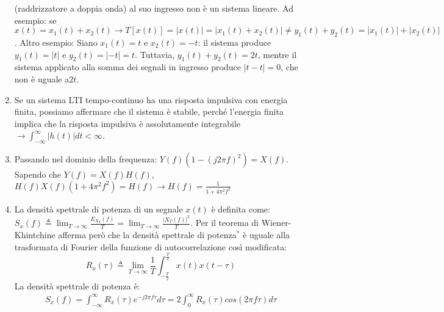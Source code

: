 \documentclass[
  paper=a4,
  ,captions=tableheading
]{scrartcl}
\begin{document}
\begin{enumerate}
  (raddrizzatore a doppia onda) al suo ingresso non è un sistema
  lineare. Ad esempio: se
  \(\displaystyle x(t)=  x_1(t)+x_2(t) \to T[x(t)]  = |x(t)| = |x_1(t)+x_2(t)| \neq y_1(t)+y_2(t) = |x_1(t)|+|x_2(t)|\).
  Altro esempio: Siano \(x_1(t) = t\) e \(x_2(t) = -t\): il sistema
  produce \(y_1(t) = |t|\) e \(y_2(t) = |-t| = t\). Tuttavia,
  \(y_1(t) + y_2(t) = 2t\), mentre il sistema applicato alla somma dei
  segnali in ingresso produce \(|t - t| = 0\), che non è uguale a\(2t\).
\item
  Se un sistema LTI tempo-continuo ha una risposta impulsiva con energia
  finita, possiamo affermare che il sistema è stabile, perché l'energia
  finita implica che la risposta impulsiva è assolutamente integrabile
  \(\to  \displaystyle \int_{-\infty}^\infty |h(t)| dt < \infty\).
\item
  Passando nel dominio della frequenza:
  \(\displaystyle Y(f)(1-(j2\pi f)^2)=X(f)\). Sapendo che
  \(Y(f)=X(f)H(f)\),
  \(\displaystyle H(f)X(f)(1+4\pi^2 f^2)=H(f) \to H(f)=\frac{1}{1+4\pi^2 f^2}\)
\item
  La densità spettrale di potenza di un segnale \(x(t)\) è definita
  come:
  \(\displaystyle S_x(f) \triangleq \lim_{T \to \infty} \frac{E_{X_T}(f)}{T} = \lim_{T \to \infty} \frac{|X_T(f)|^2}{T}\).
  Per il teorema di Wiener-Khintchine afferma però che la densità
  spettrale di potenza\(^*\) è uguale alla trasformata di Fourier della
  funzione di autocorrelazione così modificata: \[
  R_x(\tau) \triangleq  \lim_{T \to \infty} \frac{1}{T} \int_{-\frac{T}{2}}^{\frac{T}{2}}x(t)x(t-\tau)
  \] La densità spettrale di potenza è:
  \begin{gather*}\displaystyle S_x(f)= \int_{-\infty}^{\infty} R_x(\tau)e^{-j2 \pi f \tau} d\tau = 2\int_{0}^{\infty}  R_x(\tau) cos(2 \pi f \tau) d\tau
  \end{gather*}
\end{enumerate}
\end{document}
